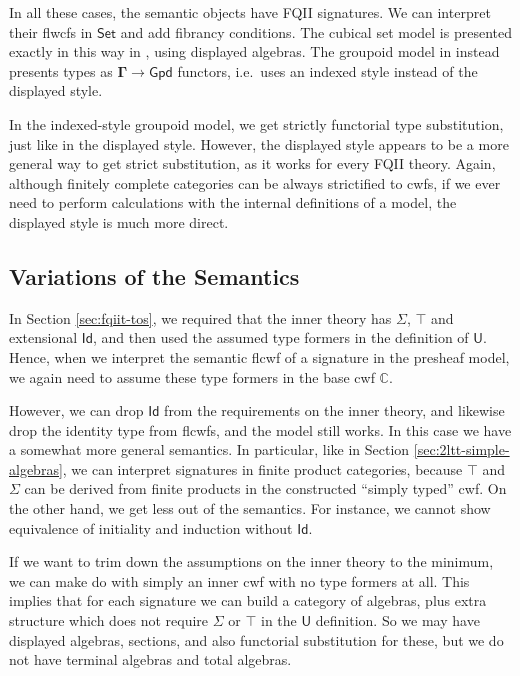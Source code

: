 \documentclass[12pt,a4paper,twoside,openany]{book}
\theoremstyle{remark}
\theoremstyle{definition}
\theoremstyle{theorem}
\newcommand{\ms}[1]{\mathsf{#1}}
\newcommand{\mbb}[1]{\mathbb{#1}}
\newcommand{\bs}[1]{\boldsymbol{#1}}
\newcommand{\U}{\mathsf{U}}
\newcommand{\Id}{\mathsf{Id}}
\newcommand{\Set}{\mathsf{Set}}
\newcommand{\bU}{\bs{\U}}
\newcommand{\mbbC}{\mbb{C}}
\begin{document}
In all these cases, the semantic objects have FQII signatures. We can interpret
their flwcfs in $\bs{\Set}$ and add fibrancy conditions. The cubical set model
is presented exactly in this way in \cite{cubical}, using displayed
algebras. The groupoid model in \cite{hofmann96groupoidmodel} instead presents
types as $\bs{\Gamma} \to \bs{\ms{Gpd}}$ functors, i.e.\ uses an indexed style
instead of the displayed style.

In the indexed-style groupoid model, we get strictly functorial type
substitution, just like in the displayed style. However, the displayed style
appears to be a more general way to get strict substitution, as it works for
every FQII theory. Again, although finitely complete categories can be always
strictified to cwfs, if we ever need to perform calculations with the
internal definitions of a model, the displayed style is much more direct.

\subsection{Variations of the Semantics}
\label{sec:fqii-variations}

In Section \ref{sec:fqiit-tos}, we required that the inner theory has $\Sigma$,
$\top$ and extensional $\Id$, and then used the assumed type formers in the
definition of $\bU$. Hence, when we interpret the semantic flcwf of a signature
in the presheaf model, we again need to assume these type formers in the base
cwf $\mbbC$.

However, we can drop $\Id$ from the requirements on the inner theory, and
likewise drop the identity type from flcwfs, and the model still works. In this
case we have a somewhat more general semantics. In particular, like in Section
\ref{sec:2ltt-simple-algebras}, we can interpret signatures in finite product
categories, because $\top$ and $\Sigma$ can be derived from finite products in
the constructed ``simply typed'' cwf. On the other hand, we get less out of the
semantics. For instance, we cannot show equivalence of initiality and induction
without $\Id$.

If we want to trim down the assumptions on the inner theory to the minimum, we
can make do with simply an inner cwf with no type formers at all. This
implies that for each signature we can build a category of algebras, plus extra
structure which does not require $\Sigma$ or $\top$ in the $\bU$ definition. So
we may have displayed algebras, sections, and also functorial substitution for
these, but we do not have terminal algebras and total algebras.
\end{document}
